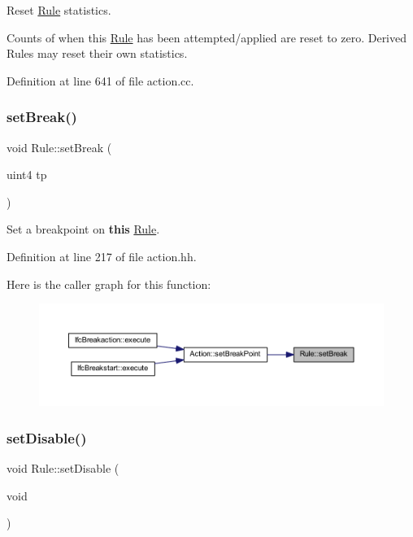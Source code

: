 Reset \mbox{\hyperlink{class_rule}{Rule}} statistics. 

Counts of when this \mbox{\hyperlink{class_rule}{Rule}} has been attempted/applied are reset to zero. Derived Rules may reset their own statistics. 

Definition at line 641 of file action.\+cc.

\mbox{\label{class_rule_a4cce5ac5ef68009ddaebc058852c5d7d}} 
\subsubsection{\texorpdfstring{setBreak()}{setBreak()}}
{\footnotesize\ttfamily void Rule\+::set\+Break (\begin{DoxyParamCaption}\item[{uint4}]{tp }\end{DoxyParamCaption})\hspace{0.3cm}{\ttfamily [inline]}}



Set a breakpoint on {\bfseries{this}} \mbox{\hyperlink{class_rule}{Rule}}. 



Definition at line 217 of file action.\+hh.

Here is the caller graph for this function\+:
\nopagebreak
\begin{figure}[H]
\begin{center}
\leavevmode
\includegraphics[width=350pt]{class_rule_a4cce5ac5ef68009ddaebc058852c5d7d_icgraph}
\end{center}
\end{figure}
\mbox{\label{class_rule_a257f9d9852eeba56c62a6df47865289b}} 
\subsubsection{\texorpdfstring{setDisable()}{setDisable()}}
{\footnotesize\ttfamily void Rule\+::set\+Disable (\begin{DoxyParamCaption}\item[{void}]{ }\end{DoxyParamCaption})\hspace{0.3cm}{\ttfamily [inline]}}



